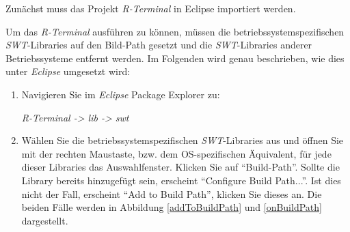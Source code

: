\documentclass[a4paper, 12pt]{report} %
\begin{document}
Zunächst muss  das Projekt \textit{R-Terminal} in Eclipse importiert werden.

Um das \textit{R-Terminal} ausführen zu können, müssen die betriebssystemspezifischen \textit{SWT}-Libraries auf den Bild-Path gesetzt und die \textit{SWT}-Libraries anderer Betriebssysteme entfernt werden.
Im Folgenden wird genau beschrieben, wie dies unter \textit{Eclipse} umgesetzt wird:
\begin{enumerate}
	\item Navigieren Sie im \textit{Eclipse} Package Explorer zu:
	\begin{center}\textit{R-Terminal -> lib  -> swt} \end{center}
	
	\item Wählen Sie die betriebssystemspezifischen \textit{SWT}-Libraries aus und öffnen Sie mit der rechten Maustaste, bzw. dem OS-spezifischen Äquivalent, für jede dieser Libraries das Auswahlfenster. Klicken Sie auf "`Build-Path"'.
		Sollte die Library bereits hinzugefügt sein, erscheint "`Configure Build Path..."'. Ist dies nicht der Fall, erscheint "`Add to Build Path"', klicken Sie dieses an. Die beiden Fälle werden  in Abbildung \ref{addToBuildPath} und \ref{onBuildPath} dargestellt.  \\


\end{enumerate}
\end{document}

